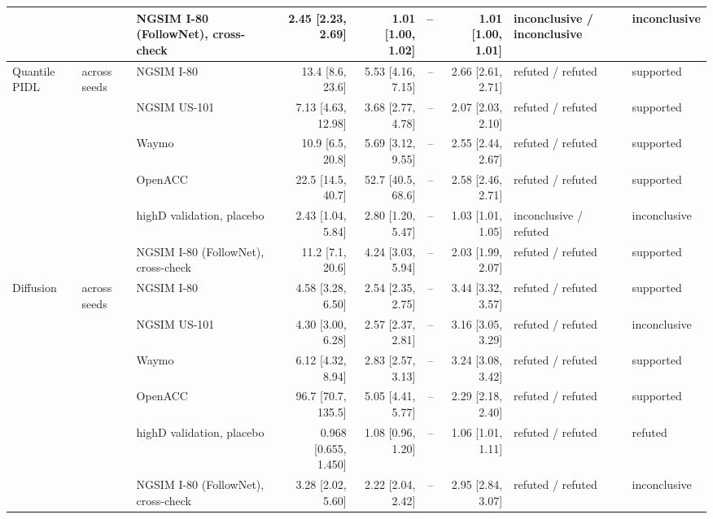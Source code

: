 \begin{longtable}{lllrrrrll}
 &  & NGSIM I-80 (FollowNet), cross-check & 2.45 [2.23, 2.69] & 1.01 [1.00, 1.02] & -- & 1.01 [1.00, 1.01] & inconclusive / inconclusive & inconclusive \\
\midrule
Quantile PIDL & across seeds & NGSIM I-80 & 13.4 [8.6, 23.6] & 5.53 [4.16, 7.15] & -- & 2.66 [2.61, 2.71] & refuted / refuted & supported \\
 &  & NGSIM US-101 & 7.13 [4.63, 12.98] & 3.68 [2.77, 4.78] & -- & 2.07 [2.03, 2.10] & refuted / refuted & supported \\
 &  & Waymo & 10.9 [6.5, 20.8] & 5.69 [3.12, 9.55] & -- & 2.55 [2.44, 2.67] & refuted / refuted & supported \\
 &  & OpenACC & 22.5 [14.5, 40.7] & 52.7 [40.5, 68.6] & -- & 2.58 [2.46, 2.71] & refuted / refuted & supported \\
 &  & highD validation, placebo & 2.43 [1.04, 5.84] & 2.80 [1.20, 5.47] & -- & 1.03 [1.01, 1.05] & inconclusive / refuted & inconclusive \\
 &  & NGSIM I-80 (FollowNet), cross-check & 11.2 [7.1, 20.6] & 4.24 [3.03, 5.94] & -- & 2.03 [1.99, 2.07] & refuted / refuted & supported \\
\midrule
Diffusion & across seeds & NGSIM I-80 & 4.58 [3.28, 6.50] & 2.54 [2.35, 2.75] & -- & 3.44 [3.32, 3.57] & refuted / refuted & supported \\
 &  & NGSIM US-101 & 4.30 [3.00, 6.28] & 2.57 [2.37, 2.81] & -- & 3.16 [3.05, 3.29] & refuted / refuted & inconclusive \\
 &  & Waymo & 6.12 [4.32, 8.94] & 2.83 [2.57, 3.13] & -- & 3.24 [3.08, 3.42] & refuted / refuted & supported \\
 &  & OpenACC & 96.7 [70.7, 135.5] & 5.05 [4.41, 5.77] & -- & 2.29 [2.18, 2.40] & refuted / refuted & supported \\
 &  & highD validation, placebo & 0.968 [0.655, 1.450] & 1.08 [0.96, 1.20] & -- & 1.06 [1.01, 1.11] & refuted / refuted & refuted \\
 &  & NGSIM I-80 (FollowNet), cross-check & 3.28 [2.02, 5.60] & 2.22 [2.04, 2.42] & -- & 2.95 [2.84, 3.07] & refuted / refuted & inconclusive \\
\end{longtable}
\endgroup
